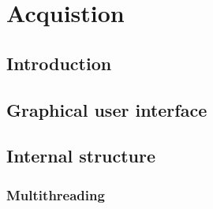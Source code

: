 \chapter{Acquistion} \label{cha:acq}

\clearpage

\section{Introduction}  %

\clearpage

\section{Graphical user interface}  %

\section{Internal structure}  %

\subsection{Multithreading}  %

\clearpage
